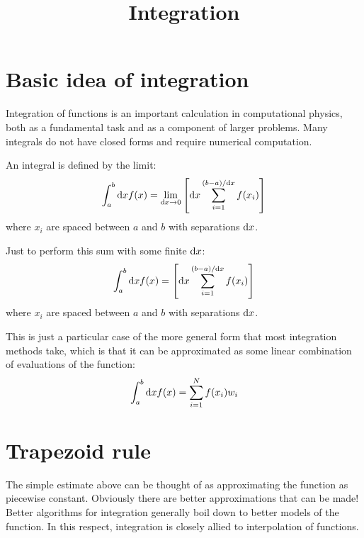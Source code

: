 \title{Integration}

\section{Basic idea of integration}

Integration of functions is an important calculation in computational
physics, both as a fundamental task and as a component of larger
problems. Many integrals do not have closed forms and require
numerical computation.


\begin{answer}
An integral is defined by the limit:
\begin{equation}
\int_a^b {\rm d}x f(x) = \lim_{{\rm d}x \rightarrow 0} \left[{\rm d}x
  \sum_{i=1}^{(b-a)/{\rm d}x} f(x_i) \right]
\end{equation}
where $x_i$ are spaced between $a$ and $b$ with separations ${\rm
  d}x$.
\end{answer}


\begin{answer}
Just to perform this sum with some finite ${\rm d}x$:
\begin{equation}
\int_a^b {\rm d}x f(x) = \left[{\rm d}x \sum_{i=1}^{(b-a)/{\rm d}x}
  f(x_i) \right]
\end{equation}
where $x_i$ are spaced between $a$ and $b$ with separations ${\rm
  d}x$.
\end{answer}

This is just a particular case of the more general form that most
integration methods take, which is that it can be approximated as some
linear combination of evaluations of the function:
\begin{equation}
  \int_a^b {\rm d}x f(x) = \sum_{i=1}^N 
  f(x_i) w_i
\end{equation}

\section{Trapezoid rule}

The simple estimate above can be thought of as approximating the
function as piecewise constant. Obviously there are better
approximations that can be made! Better algorithms for integration
generally boil down to better models of the function. In this respect,
integration is closely allied to interpolation of functions.

